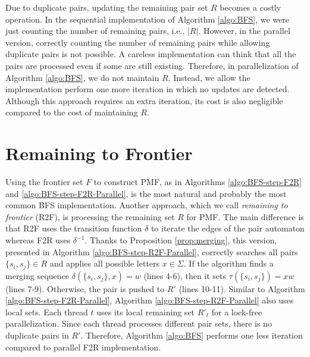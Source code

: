 Due to duplicate pairs, updating the remaining pair set $R$ becomes a costly operation. In the sequential implementation of Algorithm \ref{algo:BFS}, we were just counting the number of remaining pairs, i.e., $|R|$. However, in the parallel version, correctly counting the number of remaining pairs while allowing duplicate pairs is not possible. A careless implementation can think that all the pairs are processed even if some are still existing. Therefore, in parallelization of Algorithm \ref{algo:BFS}, we do not maintain $R$. Instead, we allow the implementation perform one more iteration in which no updates are detected. Although this approach requires an extra iteration, its cost is also negligible compared to the cost of maintaining $R$.

\section{Remaining to Frontier}
\label{sec:BFS-R2F-parallel}

Using the frontier set $F$ to construct PMF, as in Algorithms \ref{algo:BFS-step-F2R} and \ref{algo:BFS-step-F2R-Parallel}, is the most natural and probably the most common BFS implementation. Another approach, which we call \textit{remaining to frontier} (R2F), is processing the remaining set $R$ for PMF. The main difference is that R2F uses the transition function $\delta$ to iterate the edges of the pair automaton whereas F2R uses $\delta^{-1}$. Thanks to Proposition \ref{prop:merging}, this version, presented in Algorithm \ref{algo:BFS-step-R2F-Parallel}, correctly searches all pairs $\{s_i,s_j\}\in R$ and applies all possible letters $x \in \Sigma$. If the algorithm finds a merging sequence $\delta(\{ s_i,s_j \}, x) = w$ (lines 4-6), then it sets $\tau(\{ s_i,s_j \}) = xw$ (lines 7-9). Otherwise, the pair is pushed to $R'$ (lines 10-11). Similar to Algorithm \ref{algo:BFS-step-F2R-Parallel}, Algorithm \ref{algo:BFS-step-R2F-Parallel} also uses local sets. Each thread $t$ uses its local remaining set $R'_t$ for a lock-free parallelization. Since each thread processes different pair sets, there is no duplicate pairs in $R'$. Therefore, Algorithm \ref{algo:BFS} performs one less iteration compared to parallel F2R implementation.

